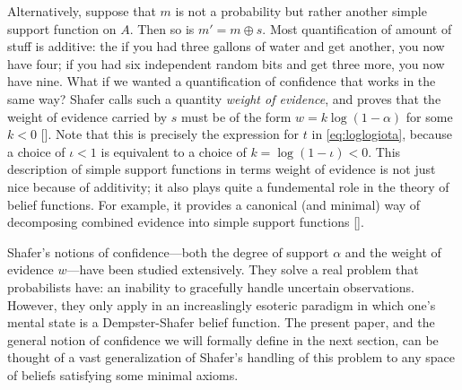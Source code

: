 \begin{example}
Alternatively, suppose that $m$ is not a probability but rather
another simple support function on $A$. 
Then so is $m' = m\oplus s$. 
Most quantification of amount of stuff is additive:
the if you had three gallons of water and get another, you now have four;
if you had six independent random bits and get three more, you now have nine. 
What if we wanted a quantification of confidence that works in the same way? 
Shafer calls such a quantity \emph{weight of evidence},
and proves that the weight of evidence carried by $s$
must be of the form
$w = k \log (1-\alpha)$ for some $k < 0$
[\citeauthor[pg 78]{shafer1976mathematical}]. 
Note that this is precisely the expression for $t$
in \eqref{eq:loglogiota}, 
because a choice of $\iota < 1$
is equivalent to a choice of $k = \log(1-\iota) < 0$.
This description of simple support functions in terms weight of 
evidence is not just nice because of additivity;
it also plays quite a fundemental role in the theory of belief
functions.
For example, it provides a
canonical (and minimal) way of decomposing
combined evidence into simple support functions
[\citeauthor[Theorem 5.5]{shafer1976mathematical}].
\end{example}

Shafer's notions of confidence---both the degree of support $\alpha$
and the weight of evidence $w$---have been studied extensively.
They solve a real problem that probabilists have: an inability
to gracefully handle uncertain observations. 
However, they only apply in an increaslingly esoteric paradigm in which
one's mental state is a Dempster-Shafer belief function. 
The present paper, and the general notion of confidence we will
formally define in the next section, 
can be thought of a vast generalization 
of Shafer's handling of this problem to any space of
beliefs satisfying some minimal axioms.

